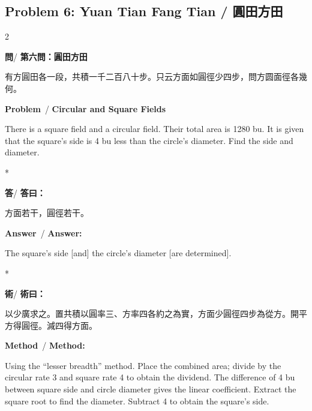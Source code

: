 \documentclass[11pt,a4paper]{article}
\newcommand{\wen}{\textbf{\color{sectioncolor}問}}
\newcommand{\da}{\textbf{\color{answercolor}答}}
\newcommand{\shu}{\textbf{\color{methodcolor}術}}
\newcommand{\prb}{\textbf{\color{sectioncolor}Problem}}
\newcommand{\ans}{\textbf{\color{answercolor}Answer}}
\newcommand{\meth}{\textbf{\color{methodcolor}Method}}
\begin{document}
\subsection*{Problem 6: Yuan Tian Fang Tian / 圓田方田}

\begin{paracol}{2}

\begin{leftcolumn*}
\wen / \textbf{第六問：圓田方田}

有方圓田各一段，共積一千二百八十步。只云方面如圓徑少四步，問方圆面徑各幾何。
\end{leftcolumn*}

\begin{rightcolumn}
\prb\ / \textbf{Circular and Square Fields}

There is a square field and a circular field. Their 
total area is 1280 bu. It is given that the square's side is 4 bu less 
than the circle's diameter. Find the side and diameter.
\end{rightcolumn}

\switchcolumn[0]*

\begin{leftcolumn*}
\da / \textbf{答曰：}

方面若干，圓徑若干。
\end{leftcolumn*}

\begin{rightcolumn}
\ans\ / \textbf{Answer:}

The square's side [and] the circle's diameter [are determined].
\end{rightcolumn}

\switchcolumn[0]*

\begin{leftcolumn*}
\shu / \textbf{術曰：}

以少廣求之。置共積以圓率三、方率四各約之為實，方面少圓徑四步為從方。開平方得圓徑。減四得方面。
\end{leftcolumn*}

\begin{rightcolumn}
\meth\ / \textbf{Method:}

Using the ``lesser breadth'' method. Place the combined 
area; divide by the circular rate 3 and square rate 4 to obtain the 
dividend. The difference of 4 bu between square side and circle diameter 
gives the linear coefficient. Extract the square root to find the diameter. 
Subtract 4 to obtain the square's side.
\end{rightcolumn}

\end{paracol}
\end{document}
